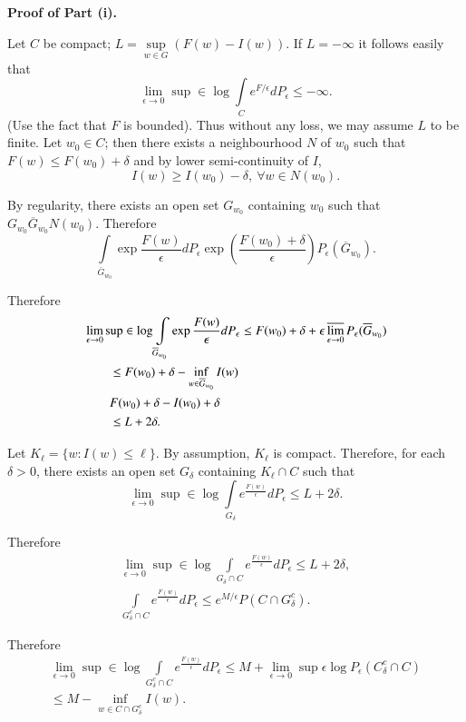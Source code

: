\noindent
{\bf Proof of Part (i).}~ 
\setcounter{step}{0}
\begin{step}%
Let $C$ be compact; $L=\sup\limits_{w\in G}(F(w)-I(w))$. If
$L=-\infty$ it follows easily that
$$
\lim\limits_{\epsilon\to 0}\sup \in
\log\int\limits_{C}e^{F/\epsilon}dP_{\epsilon}\leq -\infty.
$$
(Use the fact that $F$ is bounded). Thus without any loss, we may
assume $L$ to be finite. Let $w_{0}\in C$; then there exists a
neighbourhood $N$ of $w_{0}$ such that $F(w)\leq F(w_{0})+\delta$ and
by lower semi-continuity of $I$,
$$
I(w)\geq I(w_{0})-\delta,\ \forall w\in N(w_{0}).
$$

By regularity, there exists an open set $G_{w_{0}}$ containing $w_{0}$
such that $G_{w_{0}}\overline{G}_{w_{0}} N(w_{0})$.\pageoriginale
Therefore
$$
\int\limits_{\overline{G}_{w_{0}}}\exp
\frac{F(w)}{\epsilon}dP_{\epsilon}\exp
\left(\frac{F(w_{0})+\delta}{\epsilon}\right)P_{\epsilon}(\overline{G}_{w_{0}}). 
$$

Therefore
\begin{align*}
& \lim\limits_{\epsilon\to 0}\sup \in \log
\int\limits_{\overline{G}_{w_{0}}}\exp
\frac{F(w)}{\epsilon}dP_{\epsilon}\leq
F(w_{0})+\delta+\epsilon\varlimsup\limits_{\epsilon\to
  0}P_{\epsilon}(\overline{G}_{w_{0}})\\ 
&\qquad \leq F(w_{0})+\delta-\inf\limits_{w\in
  \overline{G}_{w_{0}}}I(w)\\
&\qquad F(w_{0})+\delta-I(w_{0})+\delta\\
&\qquad \leq L+2\delta.
\end{align*}

Let $K_{\ell}=\{w:I(w)\leq \ell\}$. By assumption, $K_{\ell}$ is
compact. Therefore, for each $\delta>0$, there exists an open set
$G_{\delta}$ containing $K_{\ell}\cap C$ such that
$$
\lim\limits_{\epsilon\to 0}\sup \in
\log\int\limits_{G_{\delta}}e^{\frac{F(w)}{\epsilon}}dP_{\epsilon}\leq L+2\delta.
$$

Therefore
\begin{gather*}
\lim\limits_{\epsilon\to 0}\sup \in \log \int\limits_{G_{\delta}\cap
  C}e^{\frac{F(w)}{\epsilon}}dP_{\epsilon}\leq L+2\delta,\\
\int\limits_{G^{c}_{\delta}\cap C}e^{\frac{F(w)}{\epsilon}}dP_{\epsilon}\leq
e^{M/\epsilon}P(C\cap G^{c}_{\delta}).
\end{gather*}

Therefore
\begin{gather*}
\lim\limits_{\epsilon\to 0}\sup \in \log
\int\limits_{G^{c}_{\delta}\cap
  C}e^{\frac{F(w)}{\epsilon}}dP_{\epsilon}\leq
M+\lim\limits_{\epsilon\to 0}\sup \epsilon \log
P_{\epsilon}(C^{c}_{\delta}\cap C)\\
\leq M-\inf\limits_{w\in C\cap G^{c}_{\delta}}I(w).
\end{gather*}


\end{step}
